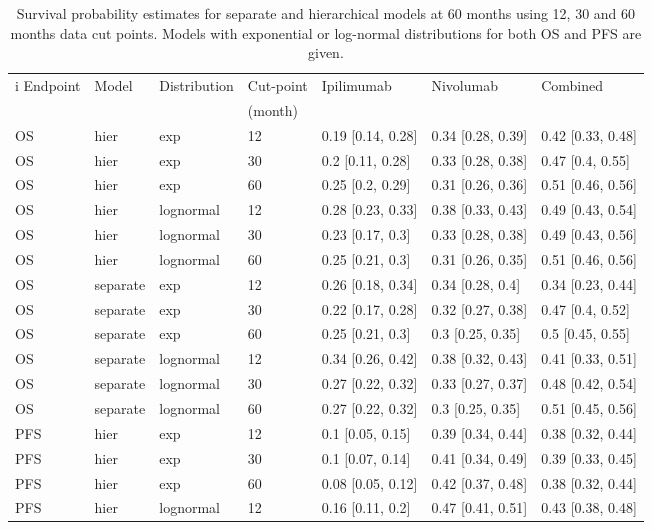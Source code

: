 \documentclass[AMA,STIX1COL]{WileyNJD-v2}
\begin{document}
\begin{table}[!ht]
\centering
\caption{Survival probability estimates for separate and hierarchical models at 60 months using 12, 30 and 60 months data cut points. Models with exponential or log-normal distributions for both OS and PFS are given. \label{tab:cutpoint_pred}}
\begin{tabular}{l|l|l|l|l|l|l}i
\hline
Endpoint & Model & Distribution & Cut-point & Ipilimumab & Nivolumab & Combined\\
 &  &  & (month) & & & \\
\hline
OS & hier & exp & 12 & 0.19 [0.14, 0.28] & 0.34 [0.28, 0.39] & 0.42 [0.33, 0.48]\\
\hline
OS & hier & exp & 30 & 0.2 [0.11, 0.28] & 0.33 [0.28, 0.38] & 0.47 [0.4, 0.55]\\
\hline
OS & hier & exp & 60 & 0.25 [0.2, 0.29] & 0.31 [0.26, 0.36] & 0.51 [0.46, 0.56]\\
\hline
OS & hier & lognormal & 12 & 0.28 [0.23, 0.33] & 0.38 [0.33, 0.43] & 0.49 [0.43, 0.54]\\
\hline
OS & hier & lognormal & 30 & 0.23 [0.17, 0.3] & 0.33 [0.28, 0.38] & 0.49 [0.43, 0.56]\\
\hline
OS & hier & lognormal & 60 & 0.25 [0.21, 0.3] & 0.31 [0.26, 0.35] & 0.51 [0.46, 0.56]\\
\hline
OS & separate & exp & 12 & 0.26 [0.18, 0.34] & 0.34 [0.28, 0.4] & 0.34 [0.23, 0.44]\\
\hline
OS & separate & exp & 30 & 0.22 [0.17, 0.28] & 0.32 [0.27, 0.38] & 0.47 [0.4, 0.52]\\
\hline
OS & separate & exp & 60 & 0.25 [0.21, 0.3] & 0.3 [0.25, 0.35] & 0.5 [0.45, 0.55]\\
\hline
OS & separate & lognormal & 12 & 0.34 [0.26, 0.42] & 0.38 [0.32, 0.43] & 0.41 [0.33, 0.51]\\
\hline
OS & separate & lognormal & 30 & 0.27 [0.22, 0.32] & 0.33 [0.27, 0.37] & 0.48 [0.42, 0.54]\\
\hline
OS & separate & lognormal & 60 & 0.27 [0.22, 0.32] & 0.3 [0.25, 0.35] & 0.51 [0.45, 0.56]\\
\hline
PFS & hier & exp & 12 & 0.1 [0.05, 0.15] & 0.39 [0.34, 0.44] & 0.38 [0.32, 0.44]\\
\hline
PFS & hier & exp & 30 & 0.1 [0.07, 0.14] & 0.41 [0.34, 0.49] & 0.39 [0.33, 0.45]\\
\hline
PFS & hier & exp & 60 & 0.08 [0.05, 0.12] & 0.42 [0.37, 0.48] & 0.38 [0.32, 0.44]\\
\hline
PFS & hier & lognormal & 12 & 0.16 [0.11, 0.2] & 0.47 [0.41, 0.51] & 0.43 [0.38, 0.48]\\

\end{tabular}
\end{table}
\end{document}
